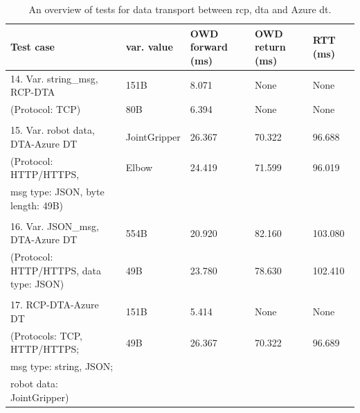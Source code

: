 \begin{table}[htbp]
    \footnotesize
\centering
\caption{An overview of tests for data transport between \gls{rcp}, \gls{dta} and Azure \gls{dt}.}
\label{tab: TestsDT}

\begin{tabular}{m{} m{} m{} m{} m{}}
\hline
\textbf{Test case}                               & \textbf{var. value}   & \textbf{OWD forward (ms)} & \textbf{OWD return (ms)} & \textbf{RTT (ms)} \\ \hline
14. Var. string\_msg, RCP-DTA           & 151B         & 8.071  & None   & None    \\
(Protocol: TCP)                         & 80B          & 6.394  & None   & None    \\
                                        &              &        &        &         \\
15. Var. robot data, DTA-Azure DT       & JointGripper & 26.367 & 70.322 & 96.688  \\
(Protocol: HTTP/HTTPS,                  & Elbow        & 24.419 & 71.599 & 96.019  \\
msg type: JSON, byte length: 49B)       &              &        &        &         \\
                                        &              &        &        &         \\
16. Var. JSON\_msg, DTA-Azure DT        & 554B         & 20.920 & 82.160 & 103.080 \\
(Protocol: HTTP/HTTPS, data type: JSON) & 49B          & 23.780 & 78.630 & 102.410 \\
                                        &              &        &        &         \\
17. RCP-DTA-Azure DT                    & 151B         & 5.414  & None   & None    \\
(Protocols: TCP, HTTP/HTTPS;            & 49B          & 26.367 & 70.322 & 96.689  \\
msg type: string, JSON;                 &              &        &        &         \\
robot data: JointGripper)               &              &        &        &         \\ \hline
\end{tabular}%

\end{table}



